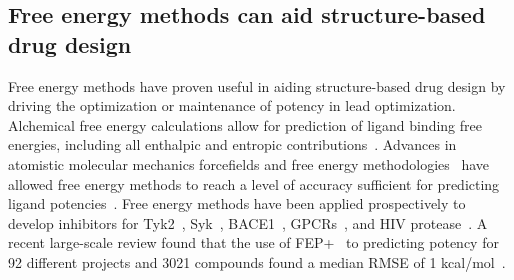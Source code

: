 \documentclass[phd,tocprelim]{cornell}
\begin{document}
\subsection{Free energy methods can aid structure-based drug design}
Free energy methods have proven useful in aiding structure-based drug design by driving the optimization or maintenance of potency in lead optimization. Alchemical free energy calculations allow for prediction of ligand binding free energies, including all enthalpic and entropic contributions~\citep{Chodera2011-jn}. Advances in atomistic molecular mechanics forcefields and free energy methodologies~\citep{Huang:J.Comput.Chem.:2013,Maier:J.Chem.TheoryComput.:2015,Harder:J.Chem.TheoryComput.:2016,Cournia:2017ip} have allowed free energy methods to reach a level of accuracy  sufficient for predicting ligand potencies~\citep{BROWN2009420}. Free energy methods have been applied prospectively to develop inhibitors for Tyk2~\citep{Abel2017-gw}, Syk~\citep{Lovering:2016fg}, BACE1~\citep{Ciordia:2016dn}, GPCRs~\citep{Lenselink:2016ip}, and HIV protease~\citep{Jorgensen:2016dv}. A recent large-scale review found that the use of FEP+~\citep{Wang:J.Am.Chem.Soc.:2015} to predicting potency for 92 different projects and 3021 compounds found a median RMSE of 1 kcal/mol~\citep{Abel:2017jt}. 
\end{document}
